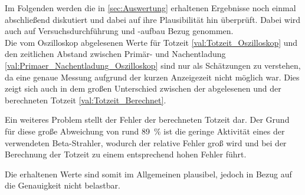 Im Folgenden werden die in \cref{sec:Auswertung} erhaltenen Ergebnisse noch einmal 
abschließend diskutiert und dabei auf ihre Plausibilität hin überprüft.
Dabei wird auch auf Versuchsdurchführung und -aufbau Bezug genommen.\\


Die vom Oszilloskop abgelesenen Werte für Totzeit \cref{val:Totzeit_Oszilloskop} und den zeitlichen Abstand
zwischen Primär- und Nachentladung \cref{val:Primaer_Nachentladung_Oszilloskop} sind nur als
Schätzungen zu verstehen, da eine genaue Messung aufgrund der kurzen Anzeigezeit nicht möglich war.
Dies zeigt sich auch in dem großen Unterschied zwischen der abgelesenen und der berechneten 
Totzeit \cref{val:Totzeit_Berechnet}. 

Ein weiteres Problem stellt der Fehler der berechneten Totzeit dar.
Der Grund für diese große Abweichung von rund \SI{89}{\percent}
ist die geringe Aktivität eines der verwendeten Beta-Strahler, wodurch 
der relative Fehler groß wird und bei der Berechnung der Totzeit zu einem entsprechend
hohen Fehler führt.

Die erhaltenen Werte sind somit im Allgemeinen plausibel, jedoch in Bezug auf die Genauigkeit nicht belastbar.  
  